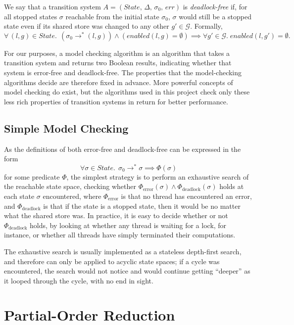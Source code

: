 \documentclass[12pt,a4paper,twoside,openright]{report}
\begin{document}
We say that a transition system
$A = (\textit{State},\, \Delta,\, \sigma_0,\, \textit{err})$
is \textit{deadlock-free} if, for all stopped states
$\sigma$ reachable from
the initial state $\sigma_0$, $\sigma$ would still be a stopped
state even if its shared store was changed to any other
$g' \in \mathcal{G}$.
Formally,
\[
	\forall\, (l, g) \in \textit{State}. \;\, (\sigma_0
	 \longrightarrow^* (l, g))
	\wedge (\textit{enabled}(l, g) = \emptyset)
	\implies \forall g' \in \mathcal{G}. \;
		\textit{enabled}(l, g') = \emptyset.
\]

For our purposes, a model checking algorithm is an
algorithm that takes a transition system and returns
two Boolean results, indicating whether that system
is error-free and deadlock-free. The properties
that the model-checking algorithms decide are
therefore fixed in advance. More
powerful concepts of model checking do exist,
but the algorithms used in this project check
only these less rich properties of transition
systems in return for better performance.

\subsection{Simple Model Checking} \label{sec:simple-model-checking}
As the definitions of both error-free and deadlock-free
can be expressed in the form
\[
	\forall \sigma \in \textit{State}.\;\, \sigma_0 \longrightarrow^* \sigma
	\implies \Phi (\sigma)
\]
for some predicate $\Phi$, the simplest strategy is to
perform an exhaustive search of the reachable state space,
checking whether $\Phi_\text{error}(\sigma) \wedge
\Phi_\text{deadlock}(\sigma)$
holds at each state $\sigma$ encountered,
where $\Phi_\text{error}$ is that
no thread has encountered an error, and $\Phi_\text{deadlock}$ is
that if the state is a stopped state, then it would be no matter
what the shared store was.
In practice, it is easy to decide whether or not
$\Phi_\text{deadlock}$ holds, by looking at whether
any thread is waiting for a lock, for instance,
or whether all threads have simply terminated
their computations.

The exhaustive search is usually
implemented as a stateless depth-first search,
and therefore can only be applied to acyclic state spaces; if
a cycle was encountered, the search would not notice and would
continue getting ``deeper'' as it looped
through the cycle, with no end in sight.

\section{Partial-Order Reduction}
\end{document}
